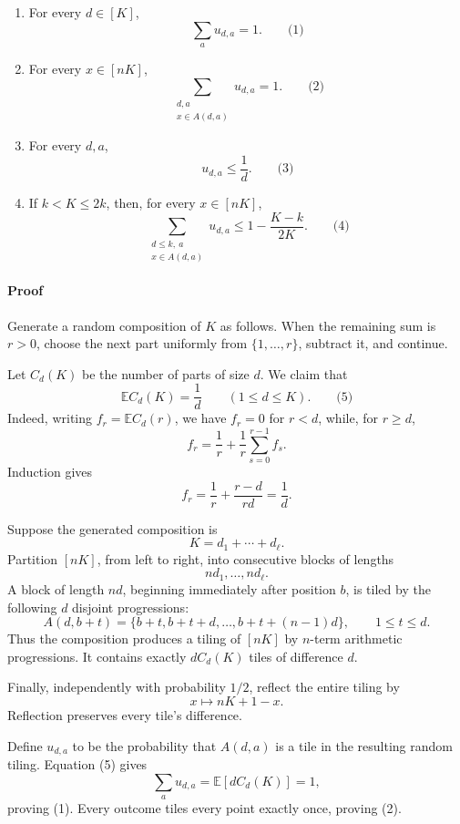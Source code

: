 \documentclass[
  11pt,
  a4paper,
]{article}
\begin{document}
\begin{enumerate}
\def\labelenumi{\arabic{enumi}.}
\item
  For every \(d\in[K]\), \[
  \sum_a u_{d,a}=1.
  \qquad\text{(1)}
  \]
\item
  For every \(x\in[nK]\), \[
  \sum_{\substack{d,a\\x\in A(d,a)}}u_{d,a}=1.
  \qquad\text{(2)}
  \]
\item
  For every \(d,a\), \[
  u_{d,a}\le \frac1d.
  \qquad\text{(3)}
  \]
\item
  If \(k<K\le2k\), then, for every \(x\in[nK]\), \[
  \sum_{\substack{d\le k,\ a\\x\in A(d,a)}}u_{d,a}
  \le 1-\frac{K-k}{2K}.
  \qquad\text{(4)}
  \]
\end{enumerate}

\paragraph{Proof}\label{proof}

Generate a random composition of \(K\) as follows. When the remaining
sum is \(r>0\), choose the next part uniformly from \(\{1,\ldots,r\}\),
subtract it, and continue.

Let \(C_d(K)\) be the number of parts of size \(d\). We claim that \[
\mathbb E C_d(K)=\frac1d
\qquad(1\le d\le K).
\qquad\text{(5)}
\] Indeed, writing \(f_r=\mathbb E C_d(r)\), we have \(f_r=0\) for
\(r<d\), while, for \(r\ge d\), \[
f_r=\frac1r+\frac1r\sum_{s=0}^{r-1}f_s.
\] Induction gives \[
f_r=\frac1r+\frac{r-d}{rd}=\frac1d.
\]

Suppose the generated composition is \[
K=d_1+\cdots+d_\ell.
\] Partition \([nK]\), from left to right, into consecutive blocks of
lengths \[
nd_1,\ldots,nd_\ell.
\] A block of length \(nd\), beginning immediately after position \(b\),
is tiled by the following \(d\) disjoint progressions: \[
A(d,b+t)=\{b+t,b+t+d,\ldots,b+t+(n-1)d\},
\qquad 1\le t\le d.
\] Thus the composition produces a tiling of \([nK]\) by \(n\)-term
arithmetic progressions. It contains exactly \(dC_d(K)\) tiles of
difference \(d\).

Finally, independently with probability \(1/2\), reflect the entire
tiling by \[
x\longmapsto nK+1-x.
\] Reflection preserves every tile's difference.

Define \(u_{d,a}\) to be the probability that \(A(d,a)\) is a tile in
the resulting random tiling. Equation (5) gives \[
\sum_a u_{d,a}
=\mathbb E[dC_d(K)]
=1,
\] proving (1). Every outcome tiles every point exactly once, proving
(2).
\end{document}
